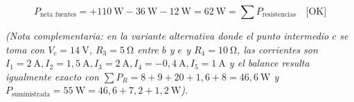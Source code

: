 \begin{ejercicio}
\begin{itemize}[leftmargin=*]
\begin{equation}
        P_{\text{neta fuentes}} = +110\ \si{\watt} - 36\ \si{\watt} - 12\ \si{\watt} = 62\ \si{\watt} = \sum P_{\text{resistencias}} \quad \text{[OK]}
    \end{equation}
\end{itemize}
\textit{(Nota complementaria: en la variante alternativa donde el punto intermedio $c$ se toma con $V_c = 14\ \si{\volt}$, $R_3 = 5\ \si{\ohm}$ entre $b$ y $e$ y $R_4 = 10\ \si{\ohm}$, las corrientes son $I_1 = 2\ \si{\ampere}, I_2 = 1{,}5\ \si{\ampere}, I_3 = 2\ \si{\ampere}, I_4 = -0{,}4\ \si{\ampere}, I_5 = 1\ \si{\ampere}$ y el balance resulta igualmente exacto con $\sum P_R = 8 + 9 + 20 + 1{,}6 + 8 = 46{,}6\ \si{\watt}$ y $P_{\text{suministrada}} = 55\ \si{\watt} = 46{,}6 + 7{,}2 + 1{,}2\ \si{\watt}$).}
\end{ejercicio}

